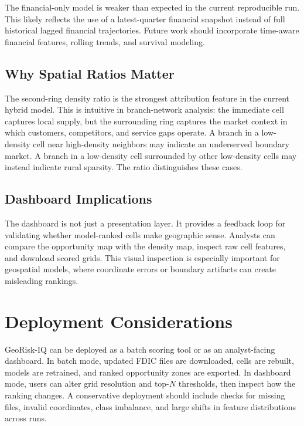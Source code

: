 \documentclass[conference]{IEEEtran}
\begin{document}
The financial-only model is weaker than expected in the current
reproducible run. This likely reflects the use of a latest-quarter financial
snapshot instead of full historical lagged financial trajectories. Future
work should incorporate time-aware financial features, rolling trends, and
survival modeling.

\subsection{Why Spatial Ratios Matter}
The second-ring density ratio is the strongest attribution feature in the
current hybrid model. This is intuitive in branch-network analysis: the
immediate cell captures local supply, but the surrounding ring captures the
market context in which customers, competitors, and service gaps operate.
A branch in a low-density cell near high-density neighbors may indicate an
underserved boundary market. A branch in a low-density cell surrounded by
other low-density cells may instead indicate rural sparsity. The ratio
distinguishes these cases.

\subsection{Dashboard Implications}
The dashboard is not just a presentation layer. It provides a feedback loop
for validating whether model-ranked cells make geographic sense. Analysts
can compare the opportunity map with the density map, inspect raw cell
features, and download scored grids. This visual inspection is especially
important for geospatial models, where coordinate errors or boundary
artifacts can create misleading rankings.

\section{Deployment Considerations}
GeoRisk-IQ can be deployed as a batch scoring tool or as an analyst-facing
dashboard. In batch mode, updated FDIC files are downloaded, cells are
rebuilt, models are retrained, and ranked opportunity zones are exported.
In dashboard mode, users can alter grid resolution and top-$N$ thresholds,
then inspect how the ranking changes. A conservative deployment should
include checks for missing files, invalid coordinates, class imbalance, and
large shifts in feature distributions across runs.
\end{document}
